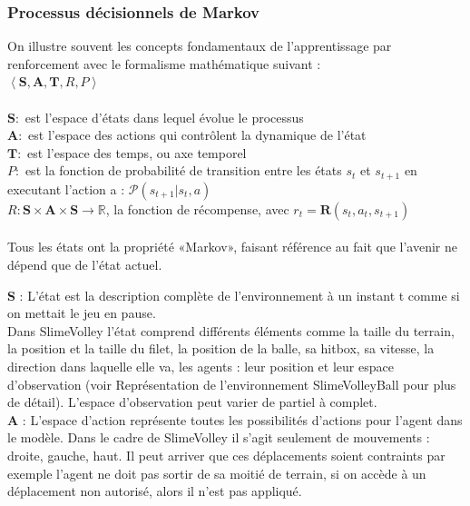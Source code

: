\documentclass[11pt, a4paper]{article}
\begin{document}
\subsubsection{Processus décisionnels de Markov}

On illustre souvent les concepts fondamentaux de l'apprentissage par renforcement avec le formalisme mathématique suivant : \\

\noindent $\left\langle \mathbf{S}, \mathbf{A}, \mathbf{T}, R, P\right\rangle $\\ \\
$\mathbf{S} :$ est l’espace d’états dans lequel évolue le processus \\
$\mathbf{A} :$ est l’espace des actions qui contrôlent la dynamique de l’état  \\ 
$\mathbf{T} :$ est l’espace des temps, ou axe temporel\\
$P :$ est la fonction de probabilité de transition entre les états $s_t$ et $s_{t+1}$ en executant l'action a : $\mathcal{P} \left(s_{t+1}|s_t,a\right)$ \\	
$R : \mathbf{S} \times \mathbf{A} \times \mathbf{S} \rightarrow \mathbb{R} $, la fonction de récompense, avec $r_t = \mathbf{R}\left(s_t, a_t, s_{t+1}\right)$  \\
\\

\noindent Tous les états ont la propriété «Markov», faisant référence au fait que l'avenir ne dépend que de l'état actuel.

\noindent \textbf{S} : L'état est la description complète de l'environnement à un instant t comme si on mettait le jeu en pause. \\
Dans SlimeVolley l'état comprend différents éléments comme la taille du terrain, la position et la taille du filet, la position de la balle, sa hitbox, sa vitesse, la direction dans laquelle elle va, les agents : leur position et leur espace d'observation (voir Représentation de l'environnement SlimeVolleyBall pour plus de détail). L'espace d'observation peut varier de partiel à complet. \\

\noindent \textbf{A} : L'espace d'action représente toutes les possibilités d'actions pour l'agent dans le modèle. Dans le cadre de SlimeVolley il s'agit seulement de mouvements : droite, gauche, haut. Il peut arriver que ces déplacements soient contraints par exemple l'agent ne doit pas sortir de sa moitié de terrain, si on accède à un déplacement non autorisé, alors il n'est pas appliqué.\\
\end{document}
